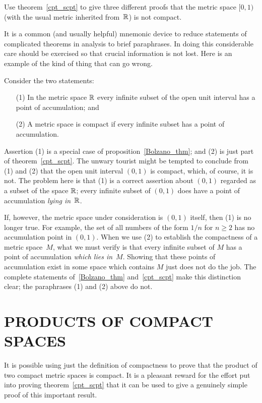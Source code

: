 \begin{prob} Use theorem~\ref{cpt_scpt} to give three different proofs that the metric space
$[0,1)$  (with the usual metric inherited from~$\mathbb{R}$) is not compact.
\end{prob}


\begin{cau} It is a common (and usually helpful) mnemonic device to reduce statements of
complicated theorems in analysis to brief paraphrases.  In doing this considerable care should
be exercised so that crucial information is not lost. Here is an example of the kind of thing
that can go wrong.

Consider the two statements:
 \begin{enumerate}
  \item[(1)] In the metric space $\mathbb{R}$ every infinite subset of the open unit interval has a point
of accumulation; and
  \item[(2)] A metric space is compact if every infinite subset has a point of accumulation.
 \end{enumerate}
Assertion (1) is a special case of proposition~\ref{Bolzano_thm}; and (2) is just part of
theorem~\ref{cpt_scpt}. The unwary tourist might be tempted to conclude from (1) and (2) that
the open unit interval $(0,1)$ is compact, which, of course, it is not. The problem here is
that (1) is a correct assertion about $(0,1)$ regarded as a subset of the space $\mathbb{R}$; every
infinite subset of $(0,1)$ does have a point of accumulation \emph{lying in}~$\mathbb{R}$.

If, however, the metric space under consideration is $(0,1)$ itself, then (1) is no longer
true. For example, the set of all numbers of the form $1/n$ for $n \ge 2$ has no accumulation
point in $(0,1)$. When we use (2) to establish the compactness of a metric space~$M$, what we
must verify is that every infinite subset of $M$ has a point of accumulation \emph{which lies
in}~$M$. Showing that these points of accumulation exist in some space which contains $M$ just
does not do the job. The complete statements of~\ref{Bolzano_thm} and~\ref{cpt_scpt} make this
distinction clear; the paraphrases (1) and (2) above do not.
\end{cau}





\section{PRODUCTS OF COMPACT SPACES}
It is possible using just the definition of compactness to prove that the product of two
compact metric spaces is compact. It is a pleasant reward for the effort put into proving
theorem~\ref{cpt_scpt} that it can be used to give a genuinely simple proof of this important
result.

